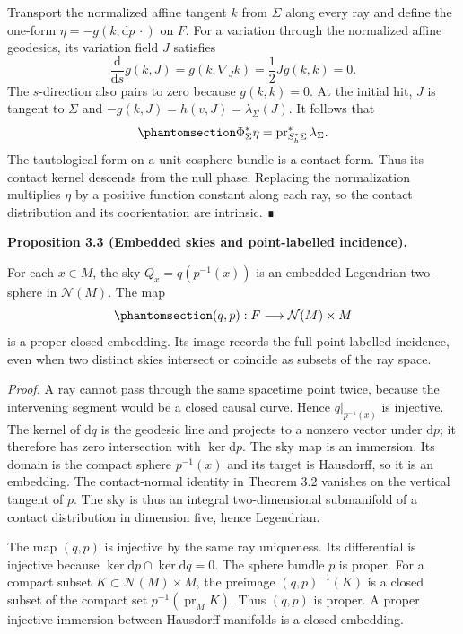 \documentclass[
  english,
  11pt,
  reqno]{amsart}
\makeatletter
\newcommand{\pandocstatementheading}[1]{%
  \par\if@nobreak\else
    \addpenalty{\@beginparpenalty}%
    \addvspace{.5\baselineskip plus .2\baselineskip minus .2\baselineskip}%
  \fi
  {\normalfont\bfseries #1\par}%
  \nobreak\@afterindenttrue\@afterheading
}
\makeatother
\begin{document}
Transport the normalized affine tangent \(k\) from \(\Sigma\) along
every ray and define the one-form \(\eta=-g(k,\mathrm dp\,\cdot)\) on
\(F\). For a variation through the normalized affine geodesics, its
variation field \(J\) satisfies \[
\frac{\mathrm d}{\mathrm ds}g(k,J)
=g(k,\nabla_Jk)
=\frac12Jg(k,k)=0.
\] The \(s\)-direction also pairs to zero because \(g(k,k)=0\). At the
initial hit, \(J\) is tangent to \(\Sigma\) and
\(-g(k,J)=h(v,J)=\lambda_\Sigma(J)\). It follows that
\begin{equation}\protect\phantomsection\label{eq:global-contact-form-flow}{
\Phi_\Sigma^*\eta
=\operatorname{pr}_{S_h^*\Sigma}^*\lambda_\Sigma.
}\end{equation} The tautological form on a unit cosphere bundle is a
contact form. Thus its contact kernel descends from the null phase.
Replacing the normalization multiplies \(\eta\) by a positive function
constant along each ray, so the contact distribution and its
coorientation are intrinsic. ∎

\pandocstatementheading{\protect{}\label{prop:global-incidence-embedding}Proposition 3.3 (Embedded skies and point-labelled incidence).}

For each \(x\in M\), the sky \(Q_x=q(p^{-1}(x))\) is an embedded
Legendrian two-sphere in \(\mathcal N(M)\). The map
\begin{equation}\protect\phantomsection\label{eq:global-point-labelled-incidence}{
(q,p):F\longrightarrow\mathcal N(M)\times M
}\end{equation} is a proper closed embedding. Its image records the full
point-labelled incidence, even when two distinct skies intersect or
coincide as subsets of the ray space.

\emph{Proof.} A ray cannot pass through the same spacetime point twice,
because the intervening segment would be a closed causal curve. Hence
\(q|_{p^{-1}(x)}\) is injective. The kernel of \(\mathrm dq\) is the
geodesic line and projects to a nonzero vector under \(\mathrm dp\); it
therefore has zero intersection with \(\ker\mathrm dp\). The sky map is
an immersion. Its domain is the compact sphere \(p^{-1}(x)\) and its
target is Hausdorff, so it is an embedding. The contact-normal identity
in Theorem 3.2 vanishes on the vertical tangent of \(p\). The sky is
thus an integral two-dimensional submanifold of a contact distribution
in dimension five, hence Legendrian.

The map \((q,p)\) is injective by the same ray uniqueness. Its
differential is injective because
\(\ker\mathrm dp\cap\ker\mathrm dq=0\). The sphere bundle \(p\) is
proper. For a compact subset \(K\subset\mathcal N(M)\times M\), the
preimage \((q,p)^{-1}(K)\) is a closed subset of the compact set
\(p^{-1}(\operatorname{pr}_M K)\). Thus \((q,p)\) is proper. A proper
injective immersion between Hausdorff manifolds is a closed embedding.
\end{document}
